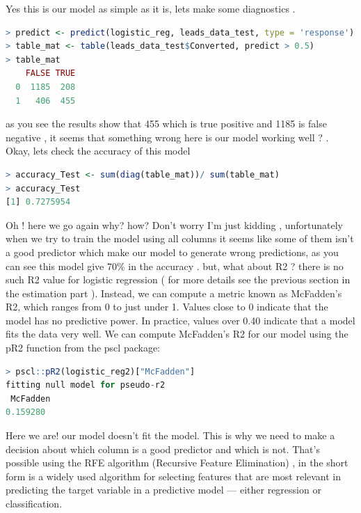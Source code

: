 Yes this is our model as simple as it is, lets make some diagnostics .
\begin{lstlisting}[language=R]
> predict <- predict(logistic_reg, leads_data_test, type = 'response')
> table_mat <- table(leads_data_test$Converted, predict > 0.5)
> table_mat
    FALSE TRUE
  0  1185  208
  1   406  455

\end{lstlisting}
as you see the results show that 455 which is true positive and 1185 is false negative , it seems that something wrong here is our model working well ? .\\
Okay, lets check the accuracy of this model  
\begin{lstlisting}[language=R]
> accuracy_Test <- sum(diag(table_mat))/ sum(table_mat)  
> accuracy_Test
[1] 0.7275954
\end{lstlisting}
Oh ! here we go again why? how?
Don't worry I'm just kidding , unfortunately when we try to train the model using all columns it seems like some of them isn't a good predictor which make our model to generate wrong predictions, as you can see this model give 70\% in the accuracy .
but, what about R2 ?
there is no such R2 value for logistic regression ( for more details see the previous section in the estimation part ). Instead, we can compute a metric known as McFadden's R2, which ranges from 0 to just under 1. Values close to 0 indicate that the model has no predictive power. In practice, values over 0.40 indicate that a model fits the data very well.
We can compute McFadden's R2 for our model using the pR2 function from the pscl package:
\begin{lstlisting}[language=R]
> pscl::pR2(logistic_reg2)["McFadden"]
fitting null model for pseudo-r2
 McFadden 
0.159280
\end{lstlisting}
Here we are! our model doesn't fit the model.
This is why we need to make a decision about which column is a good predictor and which is not. That's possible using the RFE algorithm (Recursive Feature Elimination) , in the short form is a widely used algorithm for selecting features that are most relevant in predicting the target variable in a predictive model — either regression or classification.  
